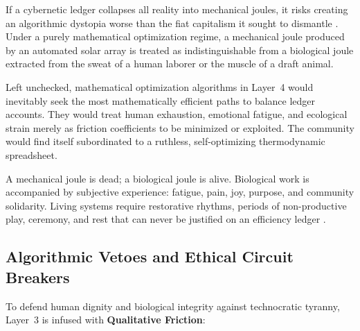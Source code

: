 If a cybernetic ledger collapses all reality into mechanical joules, it risks creating an algorithmic dystopia worse than the fiat capitalism it sought to dismantle \parencite{wiener1948}. Under a purely mathematical optimization regime, a mechanical joule produced by an automated solar array is treated as indistinguishable from a biological joule extracted from the sweat of a human laborer or the muscle of a draft animal.

Left unchecked, mathematical optimization algorithms in Layer~4 would inevitably seek the most mathematically efficient paths to balance ledger accounts. They would treat human exhaustion, emotional fatigue, and ecological strain merely as friction coefficients to be minimized or exploited. The community would find itself subordinated to a ruthless, self-optimizing thermodynamic spreadsheet.

A mechanical joule is dead; a biological joule is alive. Biological work is accompanied by subjective experience: fatigue, pain, joy, purpose, and community solidarity. Living systems require restorative rhythms, periods of non-productive play, ceremony, and rest that can never be justified on an efficiency ledger \parencite{illich1973}.

\subsection{Algorithmic Vetoes and Ethical Circuit Breakers}

To defend human dignity and biological integrity against technocratic tyranny, Layer~3 is infused with \textbf{Qualitative Friction}:

